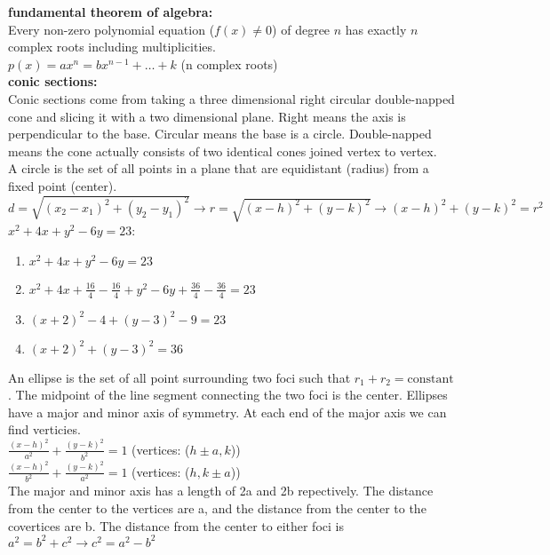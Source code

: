 \documentclass{article}
\begin{document}
\textbf{fundamental theorem of algebra:}\\

Every non-zero polynomial equation ($f(x) \neq 0$) of degree $n$ has exactly $n$ complex roots including multiplicities.\\

$p(x) = ax^n = bx^{n-1} + \ldots + k$ (n complex roots)\\

\textbf{conic sections:}\\

Conic sections come from taking a three dimensional right circular double-napped cone and slicing it with a two dimensional plane. Right means the axis is perpendicular to the base. Circular means the base is a circle. Double-napped means the cone actually consists of two identical cones joined vertex to vertex.\\

A circle is the set of all points in a plane that are equidistant (radius) from a fixed point (center). $d = \sqrt{(x_2 - x_1)^2 + (y_2 - y_1)^2} \to r = \sqrt{(x - h)^2 + (y - k)^2} \to (x - h)^2 + (y - k)^2 = r^2$\\

$x^2 + 4x + y^2 - 6y = 23$:
	\begin{enumerate}
		\item $x^2 + 4x + y^2 - 6y = 23$  
		\item $x^2 + 4x + \frac{16}{4} - \frac{16}{4} + y^2 - 6y + \frac{36}{4} - \frac{36}{4} = 23$ 
		\item $(x + 2)^2 - 4 + (y - 3)^2 - 9 = 23$
		\item $(x + 2)^2 + (y - 3)^2 = 36$
	\end{enumerate}

An ellipse is the set of all point surrounding two foci such that $r_1 + r_2 = \text{constant}$. The midpoint of the line segment connecting the two foci is the center. Ellipses have a major and minor axis of symmetry. At each end of the major axis we can find verticies.\\

$\frac{(x - h)^2}{a^2} + \frac{(y - k)^2}{b^2} = 1$ (vertices: ($h \pm a, k$))\\
$\frac{(x - h)^2}{b^2} + \frac{(y - k)^2}{a^2} = 1$ (vertices: ($h, k \pm a$))\\

The major and minor axis has a length of 2a and 2b repectively. The distance from the center to the vertices are a, and the distance from the center to the covertices are b. The distance from the center to either foci is $a^2 = b^2 + c^2 \to c^2 = a^2 - b^2$ 
\end{document}
